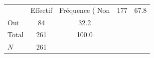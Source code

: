 {
\def\sym#1{\ifmmode^{#1}\else\(^{#1}\)\fi}
\begin{tabular}{l*{1}{cc}}
\toprule
            &    Effectif&Fréquence (%
\midrule
Non         &         177&        67.8\\
Oui         &          84&        32.2\\
Total       &         261&       100.0\\
\midrule
\(N\)       &         261&            \\
\bottomrule
\end{tabular}
}
